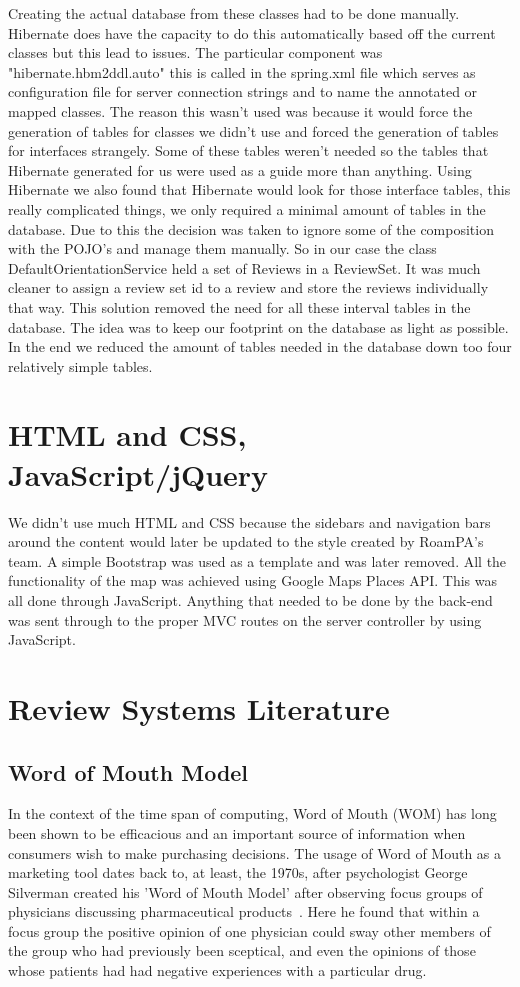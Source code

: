 Creating the actual database from these classes had to be done manually. Hibernate does have the capacity to do this automatically based off the current classes but this lead to issues. The particular component was "hibernate.hbm2ddl.auto" this is called in the spring.xml file which serves as configuration file for server connection strings and to name the annotated or mapped classes. The reason this wasn't used was because it would force the generation of tables for classes we didn't use and forced the generation of tables for interfaces strangely. Some of these tables weren't needed so the tables that Hibernate generated for us were used as a guide more than anything. Using Hibernate we also found that Hibernate would look for those interface tables, this really complicated things, we only required a minimal amount of tables in the database. Due to this the decision was taken to ignore some of the composition with the POJO's and manage them manually. So in our case the class DefaultOrientationService held a set of Reviews in a ReviewSet. It was much cleaner to assign a review set id to a review and store the reviews individually that way. This solution removed the need for all these interval tables in the database. The idea was to keep our footprint on the database as light as possible. In the end we reduced the amount of tables needed in the database down too four relatively simple tables.

\section{HTML and CSS, JavaScript/jQuery}

We didn't use much HTML and CSS because the sidebars and navigation bars around the content would later be updated to the style created by RoamPA's team. A simple Bootstrap was used as a template and was later removed. All the functionality of the map was achieved using Google Maps Places API. This was all done through JavaScript. Anything that needed to be done by the back-end was sent through to the proper MVC routes on the server controller by using JavaScript.

\section{Review Systems Literature}

\subsection{Word of Mouth Model}
In the context of the time span of computing, Word of Mouth (WOM) has long been shown to be efficacious and an important source of information when consumers wish to make purchasing decisions\cite{Nielsen}. The usage of Word of Mouth as a marketing tool dates back to, at least, the 1970s, after psychologist George Silverman created his 'Word of Mouth Model' after observing focus groups of physicians discussing pharmaceutical products~\cite{WOM}. Here he found that within a focus group the positive opinion of one physician could sway other members of the group who had previously been sceptical, and even the opinions of those whose patients had had negative experiences with a particular drug.


